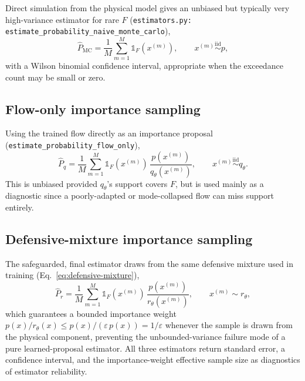 \documentclass[11pt]{article}
\begin{document}
Direct simulation from the physical model gives an unbiased but typically
very high-variance estimator for rare $F$ (\texttt{estimators.py:
estimate\_probability\_naive\_monte\_carlo}),
\begin{equation}
\hat P_{\mathrm{MC}} = \frac1M \sum_{m=1}^M \mathbb 1_F(x^{(m)}),
\qquad x^{(m)} \overset{\text{iid}}{\sim} p,
\end{equation}
with a Wilson binomial confidence interval, appropriate when the exceedance
count may be small or zero.

\subsection{Flow-only importance sampling}

Using the trained flow directly as an importance proposal
(\texttt{estimate\_probability\_flow\_only}),
\begin{equation}
\hat P_{q} = \frac1M \sum_{m=1}^M \mathbb 1_F(x^{(m)})\,
\frac{p(x^{(m)})}{q_\theta(x^{(m)})},
\qquad x^{(m)} \overset{\text{iid}}{\sim} q_\theta .
\end{equation}
This is unbiased provided $q_\theta$'s support covers $F$, but is used mainly
as a diagnostic since a poorly-adapted or mode-collapsed flow can miss
support entirely.

\subsection{Defensive-mixture importance sampling}

The safeguarded, final estimator draws from the same defensive mixture used
in training (Eq.~\eqref{eq:defensive-mixture}),
\begin{equation}
\hat P_{r} = \frac1M \sum_{m=1}^M \mathbb 1_F(x^{(m)})\,
\frac{p(x^{(m)})}{r_\theta(x^{(m)})},
\qquad x^{(m)} \sim r_\theta,
\end{equation}
which guarantees a bounded importance weight $p(x)/r_\theta(x) \le
p(x)/(\varepsilon\, p(x)) = 1/\varepsilon$ whenever the sample is drawn from
the physical component, preventing the unbounded-variance failure mode of a
pure learned-proposal estimator. All three estimators return standard error,
a confidence interval, and the importance-weight effective sample size as
diagnostics of estimator reliability.
\end{document}

